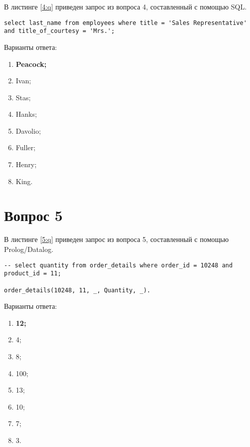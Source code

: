 \begin{appendices}
В листинге \ref{4:q} приведен запрос из вопроса 4, составленный с помощью SQL.

\begin{lstlisting}[label=4:q,caption=Вопрос 4]
select last_name from employees where title = 'Sales Representative' and title_of_courtesy = 'Mrs.';
\end{lstlisting}

Варианты ответа:

\begin{enumerate}
	\item \textbf{Peacock;}
	\item Ivan;
	\item Stas;
	\item Hanks;
	\item Davolio;
	\item Fuller;
	\item Henry;
	\item King.
\end{enumerate}

\section{Вопрос 5}

В листинге \ref{5:q} приведен запрос из вопроса 5, составленный с помощью Prolog/Datalog.

\begin{lstlisting}[label=5:q,caption=Вопрос 5]
-- select quantity from order_details where order_id = 10248 and product_id = 11;

order_details(10248, 11, _, Quantity, _).
\end{lstlisting}

Варианты ответа:

\begin{enumerate}
	\item \textbf{12;}
	\item 4;
	\item 8;
	\item 100;
	\item 13;
	\item 10;
	\item 7;
	\item 3.
\end{enumerate}


\end{appendices}
